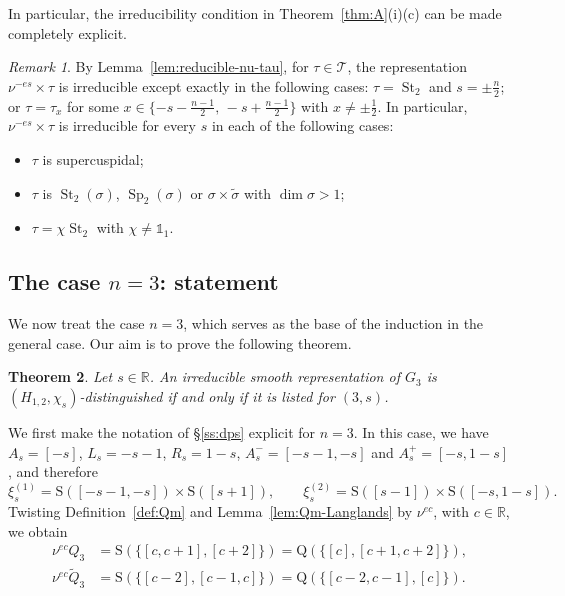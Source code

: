 \documentclass[11pt]{amsart}
\numberwithin{equation}{section}
\theoremstyle{plain}
\newtheorem{theorem}{Theorem}[section]
\theoremstyle{definition}
\theoremstyle{remark}
\newtheorem{remark}[theorem]{Remark}
\newcommand{\R}{\mathbb{R}}
\newcommand{\one}{\mathds{1}}
\newcommand{\T}{\mathcal{T}}
\DeclareMathOperator{\St}{St}
\DeclareMathOperator{\Sp}{Sp}
\newcommand{\Qt}{\widetilde{Q}}
\newcommand{\xione}{\xi^{(1)}}
\newcommand{\xitwo}{\xi^{(2)}}
\newcommand{\Ss}{\mathrm{S}}
\newcommand{\Qq}{\mathrm{Q}}
\begin{document}
In particular, the irreducibility condition in Theorem~\ref{thm:A}(i)(c) can be made completely explicit.

\begin{remark}\label{rem:irreducibility-explicit}
	By Lemma~\ref{lem:reducible-nu-tau}, for $\tau\in\T$, the representation $\nu^{-es}\times\tau$ is irreducible except exactly in the following cases: $\tau=\St_2$ and $s=\pm\frac n2$; or $\tau=\tau_x$ for some $x\in\{-s-\frac{n-1}2,\,-s+\frac{n-1}2\}$ with $x\ne\pm\frac12$. In particular, $\nu^{-es}\times\tau$ is irreducible for every $s$ in each of the following cases:
	\begin{itemize}
		\item $\tau$ is supercuspidal;
		\item $\tau$ is $\St_2(\sigma)$, $\Sp_2(\sigma)$ or $\sigma\times\widetilde\sigma$ with $\dim\sigma>1$;
		\item $\tau=\chi\St_2$ with $\chi\ne\one_1$.
	\end{itemize}
\end{remark}

\subsection{The case \texorpdfstring{$n=3$}{n=3}: statement}\label{ss:n3-statement}

We now treat the case $n=3$, which serves as the base of the induction in the general case. Our aim is to prove the following theorem.

\begin{theorem}\label{thm:n3}
	Let $s\in\R$. An irreducible smooth representation of $G_3$ is $(H_{1,2},\chi_s)$-distinguished if and only if it is listed for $(3,s)$.
\end{theorem}

We first make the notation of \S\ref{ss:dps} explicit for $n=3$. In this case, we have $A_s=[-s]$, $L_s=-s-1$, $R_s=1-s$, $A_s^-=[-s-1,-s]$ and $A_s^+=[-s,1-s]$, and therefore
$$\xione_s=\Ss([-s-1,-s])\times\Ss([s+1]),\qquad\xitwo_s=\Ss([s-1])\times\Ss([-s,1-s]).$$
Twisting Definition~\ref{def:Qm} and Lemma~\ref{lem:Qm-Langlands} by $\nu^{ec}$, with $c\in\R$, we obtain
\begin{equation}\label{eq:Q3}
	\begin{aligned}
		\nu^{ec}Q_3&=\Ss(\{[c,c+1],[c+2]\})=\Qq(\{[c],[c+1,c+2]\}),\\
		\nu^{ec}\Qt_3&=\Ss(\{[c-2],[c-1,c]\})=\Qq(\{[c-2,c-1],[c]\}).
	\end{aligned}
\end{equation}
\end{document}
